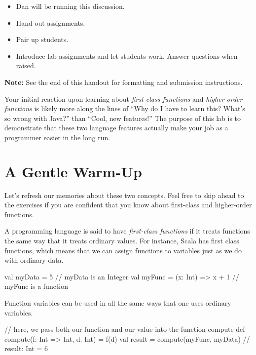 \documentclass{book}
\begin{document}
\begin{instructor}
  \begin{itemize}
    \item Dan will be running this discussion.
    \item Hand out assignments.
    \item Pair up students.
    \item Introduce lab assignments and let students work.  Answer questions when raised.
  \end{itemize}
\end{instructor}

\textbf{Note:} See the end of this handout for formatting and submission instructions.

Your initial reaction upon learning about \emph{first-class functions} and \emph{higher-order functions} is likely more along the lines of ``Why do I have to learn this?  What's so wrong with Java?'' than ``Cool, new features!''  The purpose of this lab is to demonstrate that these two language features actually make your job as a programmer easier in the long run.

\section{A Gentle Warm-Up}

Let's refresh our memories about these two concepts.  Feel free to skip ahead to the exercises if you are confident that you know about first-class and higher-order functions.

A programming language is said to have \emph{first-class functions} if it treats functions the same way that it treats ordinary values.  For instance, Scala has first class functions, which means that we can assign functions to variables just as we do with ordinary data.

\begin{scalacode}
val myData = 5                  // myData is an Integer
val myFunc = (x: Int) => x + 1  // myFunc is a function
\end{scalacode}

Function variables can be used in all the same ways that one uses ordinary variables.

\begin{scalacode}
// here, we pass both our function and our value into the function compute
def compute(f: Int => Int, d: Int) = f(d)
val result = compute(myFunc, myData)
// result: Int = 6
\end{scalacode}
\end{document}
